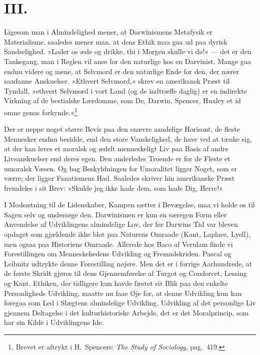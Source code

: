 \documentclass[12pt,a4paper]{article}
\begin{document}
\section*{III.}

Ligesom man i Almindelighed mener, at Darwinismens
Metafysik er Materialisme, saaledes mener man, at dens
Ethik maa gaa ud paa dyrisk Sandselighed. »Lader os æde
og drikke, thi i Morgen skulle vi dø!« --- det er den
Tankegang, man i Reglen vil anse for den naturlige hos en
Darvinist. Mange gaa endnu videre og mene, at Selvmord
er den naturlige Ende for den, der nærer saadanne
Anskuelser. »Ethvert Selvmord,« skrev en amerikansk Præst
til Tyndall, »ethvert Selvmord i vort Land (og de
indtræffe daglig) er en indirekte Virkning af de bestialske
Lærdomme, som De, Darwin, Spencer, Huxley et id omne
genus forkynde.«\footnote{Brevet er aftrykt i H.\ Spencers:
\textit{The Study of Sociology}, pag.\ 419.}

Der er neppe noget større Bevis paa den snævre
aandelige Horisont, de fleste Mennesker endnu besidde, end
den store Vanskelighed, de have ved at tænke sig, at der
kan leves et moralsk og ædelt menneskeligt Liv paa Basis
af andre Livsanskuelser end deres egen. Den anderledes
Troende er for de Fleste et umoralsk Væsen. Og bag
Beskyldningen for Umoralitet ligger Noget, som er værre;
der ligger Fanatismens Had. Saaledes skriver hin
amerikanske Præst fremdeles i sit Brev: »Skulde jeg ikke
hade dem, som hade Dig, Herre!«

I Modsætning til de Lidenskaber, Kampen sætter i
Bevægelse, maa vi holde os til Sagen selv og undersøge
den. Darwinismen er kun en særegen Form eller Anvendelse
af Udviklingens almindelige Lov, der før Darwins Tid var
bleven opdaget som gjældende ikke blot paa Naturens
Omraade (Kant, Laplace, Lyell), men ogsaa paa Historiens
Omraade. Allerede hos Baco af Verulam finde vi
Forestillingen om Menneskehedens Udvikling og
Fremadskriden. Pascal og Leibnitz udtrykte denne
Forestilling nøjere. Men det er i forrige Aarhundrede, at
de første Skridt gjøres til dens Gjennemførelse af Turgot
og Condorcet, Lessing og Kant. Ethiken, der tidligere kun
havde fæstet sit Blik paa den enkelte Personligheds
Udvikling, maatte nu faae Øje for, at denne Udvikling kun
kan foregaa som Led i Slægtens almindelige Udvikling.
Udvikling af det personlige Liv gjennem Deltagelse i det
kulturhistoriske Arbejde, det er det Moralprincip, som har
sin Kilde i Udviklingens Ide.
\end{document}
